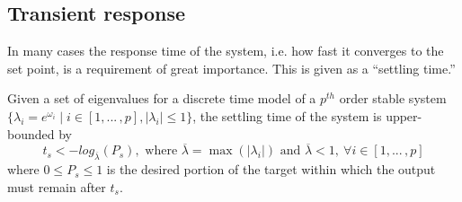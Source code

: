 \documentclass[sigconf]{llncs}
\newcommand{\mat}[1]{{#1}}
\renewcommand{\vec}[1]{{#1}}
\begin{document}

\subsection{Transient response} 
\label{sec:transientspecification}
In many cases the response time of the system, i.e. how fast it converges to the set point, is a requirement of great importance. 
This is given as a ``settling time.'' 
 
\begin{theorem}
Given a set of eigenvalues for a discrete time model of a $p^{th}$ order stable system $\{\lambda_i =e^{\omega_i} \mid i \in [1, ...\,,p], |\lambda_i| \leq 1 \}$, the settling time of the system is upper-bounded by
\begin{equation}
t_s<-log_{\overline{\lambda}}({P_s}), \text{ where }  \overline{\lambda} = \max(|\lambda_i|) \text{ and } \overline{\lambda}<1,\ \forall i \in [1, ...\,,p]
\label{eq:set_time}
\end{equation}
where $0\leq P_s \leq 1$ is the desired portion of the target within which the output must remain after $t_s$.
\end{theorem}
\end{document}
